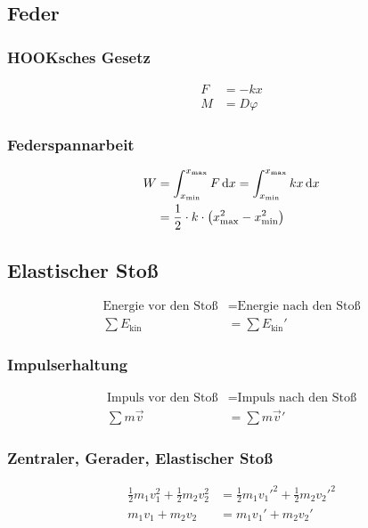 \newpage
\subsection{Feder}
\begin{multicols}{2}{}
\subsubsection*{HOOKsches Gesetz}
\begin{align*}
F&=-kx\\
M&=D\varphi
\end{align*}

\subsubsection*{Federspannarbeit}
\begin{align*}
W	&=\int_{x_\text{min}}^{x_\text{max}}F\mathop{}\!\mathrm{d} x=\int_{x_\text{min}}^{x_\text{max}}kx\mathop{}\!\mathrm{d} x\\
	&=\frac{1}{2}\cdot k\cdot \left(x_{\text{max}}^2-x_{\text{min}}^2\right)
\end{align*}
\end{multicols}

\subsection{Elastischer Stoß}
\begin{align*}
\text{Energie vor den Stoß} &= \text{Energie nach den Stoß}\nonumber\\
\sum E_{\text{kin}}&=\sum E_{\text{kin}}'
\end{align*}


\subsubsection*{Impulserhaltung}
\begin{align*}
\text{Impuls vor den Stoß} &= \text{Impuls nach den Stoß}\nonumber\\
\sum m\vec{v}&= \sum m\vec{v}'
\end{align*}


\subsubsection*{Zentraler, Gerader, Elastischer Stoß}
\begin{align*}
\frac{1}{2}m_1v_1^2+\frac{1}{2}m_2v_2^2&=\frac{1}{2}m_1v_1'^2+\frac{1}{2}m_2v_2'^2\\
m_1v_1+m_2v_2&=m_1v_1'+m_2v_2'
\end{align*}

